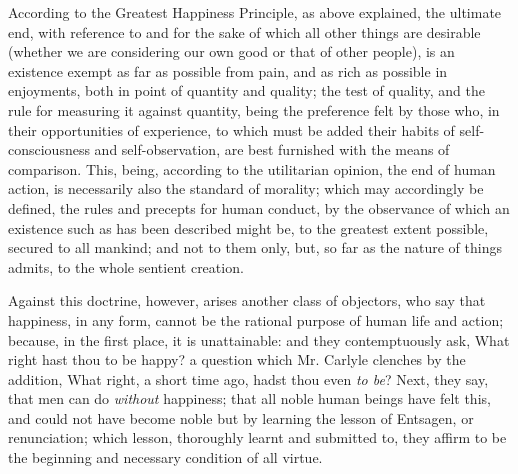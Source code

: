 \documentclass[12pt]{report}
\begin{document}
According to the Greatest Happiness Principle, as above explained, the ultimate end, with reference to and for the sake of which all other things are desirable (whether we are considering our own good or that of other people), is an existence exempt as far as possible from pain, and as rich as possible in enjoyments, both in point of quantity and quality; the test of quality, and the rule for measuring it against quantity, being the preference felt by those who, in their opportunities of experience, to which must be added their habits of self-consciousness and self-observation, are best furnished with the means of comparison. This, being, according to the utilitarian opinion, the end of human action, is necessarily also the standard of morality; which may accordingly be defined, the rules and precepts for human conduct, by the observance of which an existence such as has been described might be, to the greatest extent possible, secured to all mankind; and not to them only, but, so far as the nature of things admits, to the whole sentient creation.

Against this doctrine, however, arises another class of objectors, who say that happiness, in any form, cannot be the rational purpose of human life and action; because, in the first place, it is unattainable: and they contemptuously ask, What right hast thou to be happy? a question which Mr. Carlyle clenches by the addition, What right, a short time ago, hadst thou even \emph{to be}? Next, they say, that men can do \emph{without} happiness; that all noble human beings have felt this, and could not have become noble but by learning the lesson of Entsagen, or renunciation; which lesson, thoroughly learnt and submitted to, they affirm to be the beginning and necessary condition of all virtue.
\end{document}
